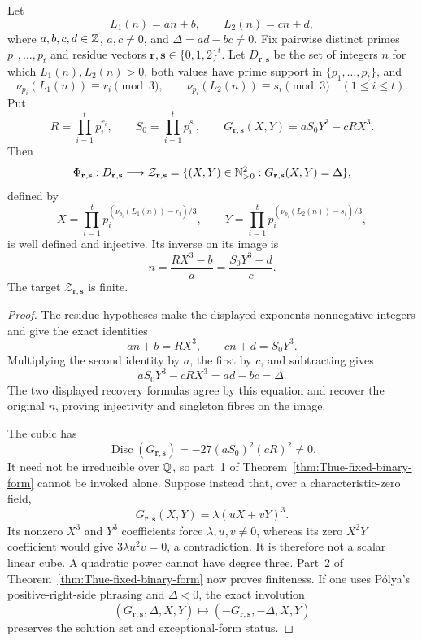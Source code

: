 \begin{proposition}
\label{prop:Polya-residue-cell-cubic}
Let
\[
 L_1(n)=an+b,\qquad L_2(n)=cn+d,
\]
where $a,b,c,d\in\mathbb{Z}$, $a,c\ne0$, and
$\Delta=ad-bc\ne0$.  Fix pairwise distinct primes
$p_1,\ldots,p_t$ and residue vectors
$\mathbf r,\mathbf s\in\{0,1,2\}^t$.  Let
$D_{\mathbf r,\mathbf s}$ be the set of integers $n$ for which
$L_1(n),L_2(n)>0$, both values have prime support in
$\{p_1,\ldots,p_t\}$, and
\[
 \nu_{p_i}(L_1(n))\equiv r_i\pmod3,\qquad
 \nu_{p_i}(L_2(n))\equiv s_i\pmod3
 \quad(1\leq i\leq t).
\]
Put
\[
 R=\prod_{i=1}^t p_i^{r_i},\qquad
 S_0=\prod_{i=1}^t p_i^{s_i},\qquad
 G_{\mathbf r,\mathbf s}(X,Y)=aS_0Y^3-cRX^3.
\]
Then
\[
 \Phi_{\mathbf r,\mathbf s}:D_{\mathbf r,\mathbf s}
 \longrightarrow
 \mathcal Z_{\mathbf r,\mathbf s}
 =\{(X,Y)\in\mathbb{N}_{>0}^2:G_{\mathbf r,\mathbf s}(X,Y)=\Delta\},
\]
defined by
\[
 X=\prod_{i=1}^t
 p_i^{(\nu_{p_i}(L_1(n))-r_i)/3},
 \qquad
 Y=\prod_{i=1}^t
 p_i^{(\nu_{p_i}(L_2(n))-s_i)/3},
\]
is well defined and injective.  Its inverse on its image is
\[
 n=\frac{RX^3-b}{a}=\frac{S_0Y^3-d}{c}.
\]
The target $\mathcal Z_{\mathbf r,\mathbf s}$ is finite.
\end{proposition}

\begin{proof}
The residue hypotheses make the displayed exponents nonnegative integers and
give the exact identities
\[
 an+b=RX^3,\qquad cn+d=S_0Y^3.
\]
Multiplying the second identity by $a$, the first by $c$, and subtracting
gives
\[
 aS_0Y^3-cRX^3=ad-bc=\Delta.
\]
The two displayed recovery formulas agree by this equation and recover the
original $n$, proving injectivity and singleton fibres on the image.

The cubic has
\[
 \operatorname{Disc}(G_{\mathbf r,\mathbf s})
 =-27(aS_0)^2(cR)^2\ne0.
\]
It need not be irreducible over $\mathbb{Q}$, so part~1 of
Theorem~\ref{thm:Thue-fixed-binary-form} cannot be invoked alone.  Suppose
instead that, over a characteristic-zero field,
\[
 G_{\mathbf r,\mathbf s}(X,Y)=\lambda(uX+vY)^3.
\]
Its nonzero $X^3$ and $Y^3$ coefficients force
$\lambda,u,v\ne0$, whereas its zero $X^2Y$ coefficient would give
$3\lambda u^2v=0$, a contradiction.  It is therefore not a scalar linear
cube.  A quadratic power cannot have degree three.  Part~2 of
Theorem~\ref{thm:Thue-fixed-binary-form} now proves finiteness.  If one uses
P\'olya's positive-right-side phrasing and $\Delta<0$, the exact involution
\[
 (G_{\mathbf r,\mathbf s},\Delta,X,Y)
 \longmapsto
 (-G_{\mathbf r,\mathbf s},-\Delta,X,Y)
\]
preserves the solution set and exceptional-form status.
\end{proof}

